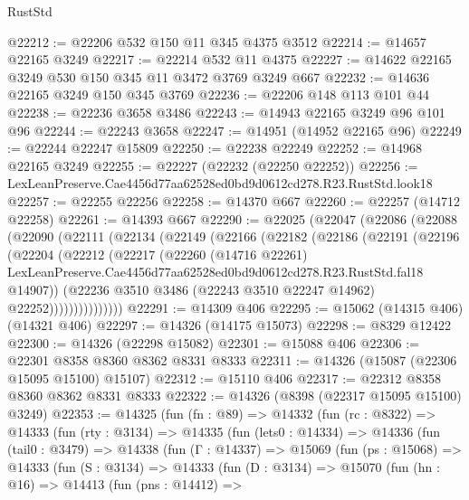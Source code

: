 \begin{lexlean}{RustStd}
\begin{coremodule}
@22212 := @22206 @532 @150 @11 @345 @4375 @3512
@22214 := @14657 @22165 @3249
@22217 := @22214 @532 @11 @4375
@22227 := @14622 @22165 @3249 @530 @150 @345 @11 @3472 @3769 @3249 @667
@22232 := @14636 @22165 @3249 @150 @345 @3769
@22236 := @22206 @148 @113 @101 @44
@22238 := @22236 @3658 @3486
@22243 := @14943 @22165 @3249 @96 @101 @96
@22244 := @22243 @3658
@22247 := @14951 (@14952 @22165 @96)
@22249 := @22244 @22247 @15809
@22250 := @22238 @22249
@22252 := @14968 @22165 @3249
@22255 := @22227 (@22232 (@22250 @22252))
@22256 := LexLeanPreserve.Cae4456d77aa62528ed0bd9d0612cd278.R23.RustStd.look18
@22257 := @22255 @22256
@22258 := @14370 @667
@22260 := @22257 (@14712 @22258)
@22261 := @14393 @667
@22290 := @22025
    (@22047
      (@22086
        (@22088
          (@22090
            (@22111
              (@22134
                (@22149
                  (@22166
                    (@22182
                      (@22186
                        (@22191
                          (@22196
                            (@22204
                              (@22212
                                (@22217
                                  (@22260
                                    (@14716 @22261)
                                    LexLeanPreserve.Cae4456d77aa62528ed0bd9d0612cd278.R23.RustStd.fal18
                                    @14907))
                                (@22236
                                  @3510
                                  @3486
                                  (@22243 @3510 @22247 @14962)
                                  @22252)))))))))))))))
@22291 := @14309 @406
@22295 := @15062 (@14315 @406) (@14321 @406)
@22297 := @14326 (@14175 @15073)
@22298 := @8329 @12422
@22300 := @14326 (@22298 @15082)
@22301 := @15088 @406
@22306 := @22301 @8358 @8360 @8362 @8331 @8333
@22311 := @14326 (@15087 (@22306 @15095 @15100) @15107)
@22312 := @15110 @406
@22317 := @22312 @8358 @8360 @8362 @8331 @8333
@22322 := @14326 (@8398 (@22317 @15095 @15100) @3249)
@22353 := @14325
    (fun (fn : @89) =>
    @14332
      (fun (rc : @8322) =>
      @14333
        (fun (rty : @3134) =>
        @14335
          (fun (lets0 : @14334) =>
          @14336
            (fun (tail0 : @3479) =>
            @14338
              (fun (Γ : @14337) =>
              @15069
                (fun (ps : @15068) =>
                @14333
                  (fun (S : @3134) =>
                  @14333
                    (fun (D : @3134) =>
                    @15070
                      (fun (hn : @16) =>
                      @14413
                        (fun (pns : @14412) =>

\end{coremodule}
\end{lexlean}
